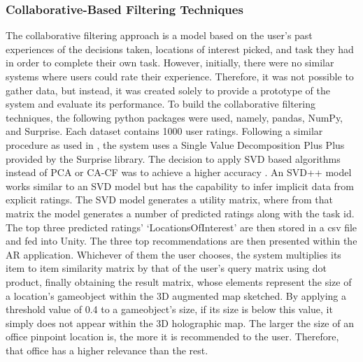 \documentclass{aifyp}
\begin{document}
\subsubsection{Collaborative-Based Filtering Techniques}
The collaborative filtering approach is a model based on the user’s past experiences of the decisions taken, locations of interest picked, and task they had in order to complete their own task. However, initially, there were no similar systems where users could rate their experience. Therefore, it was not possible to gather data, but instead, it was created solely to provide a prototype of the system and evaluate its performance. To build the collaborative filtering techniques, the following python packages were used, namely, pandas, NumPy, and Surprise. Each dataset contains 1000 user ratings. Following a similar procedure as used in \cite{SVDEvaluation}, the system uses a Single Value Decomposition Plus Plus provided by the Surprise library. The decision to apply SVD based algorithms instead of PCA or CA-CF was to achieve a higher accuracy \cite{SVDEvaluation}. An SVD++ model works similar to an SVD model but has the capability to infer implicit data from explicit ratings. The SVD model generates a utility matrix, where from that matrix the model generates a number of predicted ratings along with the task id. The top three predicted ratings' `LocationsOfInterest' are then stored in a csv file and fed into Unity. 
\newline
\newline
The three top recommendations are then presented within the AR application. Whichever of them the user chooses, the system multiplies its item to item similarity matrix by that of the user’s query matrix using dot product, finally obtaining the result matrix, whose elements represent the size of a location’s gameobject within the 3D augmented map sketched. By applying a threshold value of 0.4 to a gameobject’s size, if its size is below this value, it simply does not appear within the 3D holographic map. The larger the size of an office pinpoint location is, the more it is recommended to the user. Therefore, that office has a higher relevance than the rest. 
\end{document}

